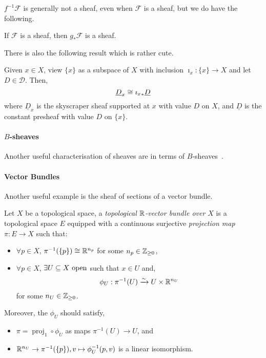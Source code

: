 \documentclass[000-main.tex]{subfiles}
\begin{document}
$f^{-1}\mathcal{F}$ is generally not a sheaf, even when $\mathcal{F}$ is a sheaf, but we do have the following.
\begin{lemma}
  If $\mathcal{F}$ is a sheaf, then $g_*\mathcal{F}$ is a sheaf.
\end{lemma}
There is also the following result which is rather cute.
\begin{lemma}
  Given $x\in X$, view $\{x\}$ as a subspace of $X$ with inclusion $\imath_x: \{x\}\to X$ and let $D\in \mathcal{D}$.
  Then,
  \begin{displaymath}
    \underline{D}_x \cong {{\imath_x}_{*}}\underline{D}
  \end{displaymath}
  where $\underline{D}_x$ is the skyscraper sheaf supported at $x$ with value $D$ on $X$, and $\underline{D}$ is the constant presheaf with value $D$ on $\{x\}$.
\end{lemma}


\paragraph{$B$-sheaves}

Another useful characterisation of sheaves are in terms of $B$-sheaves~\cite[][16-17]{eisenbudGeometrySchemes2000}.

\paragraph{Vector Bundles}%

Another useful example is the sheaf of sections of a vector bundle.
\begin{definition}
  Let $X$ be a topological space, a \emph{topological $\mathbb{R}$-vector bundle over $X$} is a topological space $E$ equipped with a continuous surjective \emph{projection map} $\pi: E \to X$ such that:
  \begin{itemize}
    \item $\forall p\in X$, $\pi^{-1}(\{p\}) \cong \mathbb{R}^{n_p}$ for some $n_p\in\mathbb{Z}_{\geq0}$,
    \item $\forall p\in X$, $\exists U\subseteq X\text{ open}$ such that $x\in U$ and,
          \begin{displaymath}
            \phi_U: \pi^{-1}(U) \xrightarrow{\sim} U\times \mathbb{R}^{n_U}
          \end{displaymath}
          for some $n_U\in\mathbb{Z}_{\geq0}$.
  \end{itemize}
  Moreover, the $\phi_U$ should satisfy,
  \begin{itemize}
    \item \(\pi = \operatorname{proj}_1\circ \phi_U\) as maps $\pi^{-1}(U) \to U$, and
    \item $\mathbb{R}^{n_U}\to \pi^{-1}(\{p\}), v \mapsto \phi^{-1}_U(p, v)$ is a linear isomorphism.
  \end{itemize}
\end{definition}
\end{document}
